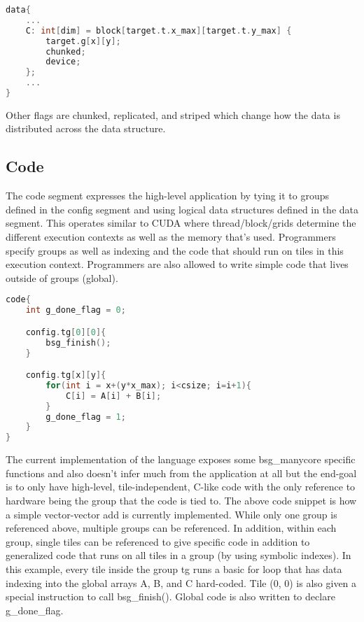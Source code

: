 \documentclass{article}
\begin{document}
\begin{minipage}[c]{\textwidth}
\begin{lstlisting}[language=C, caption=Declaring vector mappings for memory]
data{
    ...
    C: int[dim] = block[target.t.x_max][target.t.y_max] {
        target.g[x][y];
        chunked;
        device;
    };
    ...
}
\end{lstlisting}
\end{minipage}

Other flags are chunked, replicated, and striped which change how the data is distributed across the data structure. \\

\subsection{Code}

The code segment expresses the high-level application by tying it to groups defined in the config segment and using logical data structures defined in the data segment. This operates similar to CUDA where thread/block/grids determine the different execution contexts as well as the memory that's used. Programmers specify groups as well as indexing and the code that should run on tiles in this execution context. Programmers are also allowed to write simple code that lives outside of groups (global). \\

\begin{minipage}[c]{\textwidth}
\begin{lstlisting}[language=C, caption=Declaring vector mappings for memory]
code{
    int g_done_flag = 0;

    config.tg[0][0]{
        bsg_finish();
    }

    config.tg[x][y]{
        for(int i = x+(y*x_max); i<csize; i=i+1){
            C[i] = A[i] + B[i];
        }
        g_done_flag = 1;
    }
}
\end{lstlisting}
\end{minipage}

The current implementation of the language exposes some bsg\_manycore specific functions and also doesn't infer much from the application at all but the end-goal is to only have high-level, tile-independent, C-like code with the only reference to hardware being the group that the code is tied to. The above code snippet is how a simple vector-vector add is currently implemented. While only one group is referenced above, multiple groups can be referenced. In addition, within each group, single tiles can be referenced to give specific code in addition to generalized code that runs on all tiles in a group (by using symbolic indexes). In this example, every tile inside the group tg runs a basic for loop that has data indexing into the global arrays A, B, and C hard-coded. Tile (0, 0) is also given a special instruction to call bsg\_finish(). Global code is also written to declare g\_done\_flag.
\end{document}
